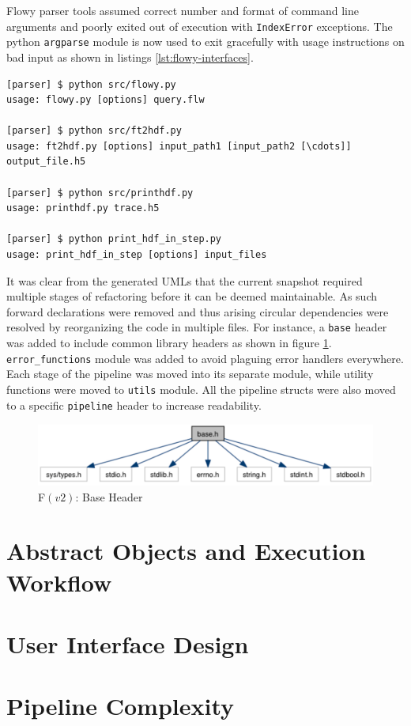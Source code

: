 Flowy parser tools assumed correct number and format of command line arguments
and poorly  exited out of execution
with \texttt{IndexError} exceptions.  The python \texttt{argparse} module is
now used to exit gracefully with usage instructions on bad input as shown in
listings \ref{lst:flowy-interfaces}.

\begin{lstlisting}
[parser] $ python src/flowy.py
usage: flowy.py [options] query.flw

[parser] $ python src/ft2hdf.py
usage: ft2hdf.py [options] input_path1 [input_path2 [\cdots]] output_file.h5

[parser] $ python src/printhdf.py
usage: printhdf.py trace.h5

[parser] $ python print_hdf_in_step.py
usage: print_hdf_in_step [options] input_files
\end{lstlisting}

It was clear from the generated \ac{UML}s that the current snapshot required
multiple stages of refactoring before it can be deemed maintainable. As such
forward declarations were removed and thus arising circular dependencies were
resolved by reorganizing the code in multiple files. For   instance, a \texttt{base} header was added to include common library
headers as shown in figure \ref{fig:base-header}.  \texttt{error\_functions}
module was added to avoid plaguing error handlers everywhere. Each stage of
the pipeline was moved into its separate module, while utility functions were
moved to \texttt{utils} module. All the pipeline structs were also moved to a
specific \texttt{pipeline} header to increase readability.

\begin{figure}[h!]
\begin{center}
  \includegraphics* [width=1.0\linewidth]{figures/base-header}	
  \caption{F$(v2)$: Base Header}
  \label{fig:base-header}
\end{center}
\end{figure}

\section{Abstract Objects and Execution Workflow}\label{sec:adt-workflow}
\section{User Interface Design}\label{sec:engine-interface}
\section{Pipeline Complexity}\label{sec:engine-complexity}

